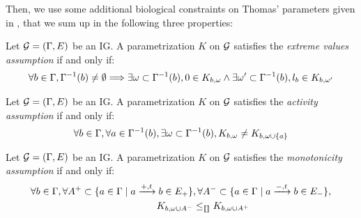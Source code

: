 Then, we use some additional biological constraints on Thomas' parameters given in
\cite{BernotSemBRN}, that we sum up in the following three properties:

\begin{property}
Let $\mathcal{G} = (\Gamma, E)$ be an IG. A parametrization $K$ on $\mathcal{G}$ satisfies the \emph{extreme values assumption} if and only if:
\label{pro:param_enum_extreme}
\begin{align*}
  \forall b \in \Gamma, \Gamma^{-1}(b) \neq \emptyset \Longrightarrow \exists \omega \subset \Gamma^{-1}(b), 0 \in K_{b,\omega} \wedge \exists \omega' \subset \Gamma^{-1}(b), l_b \in K_{b,\omega'}
\end{align*}
\end{property}

\begin{property}
\label{pro:param_enum_activity}
Let $\mathcal{G} = (\Gamma, E)$ be an IG. A parametrization $K$ on $\mathcal{G}$ satisfies the \emph{activity assumption} if and only if:
\begin{align*}
  \forall b \in \Gamma, \forall a \in \Gamma^{-1}(b), \exists \omega \subset \Gamma^{-1}(b), K_{b,\omega} \neq K_{b,\omega \cup \{ a \}}
\end{align*}
\end{property}

\begin{property}
\label{pro:param_enum_monotonicity}
Let $\mathcal{G} = (\Gamma, E)$ be an IG. A parametrization $K$ on $\mathcal{G}$ satisfies the \emph{monotonicity assumption} if and only if:
\begin{align*}
  \forall b \in \Gamma,
  \forall A^+ \subset \{ a \in \Gamma \mid a \xrightarrow{+, t} b \in E_+ \}&,
  \forall A^- \subset \{ a \in \Gamma \mid a \xrightarrow{-, t} b \in E_- \},\\
  K_{b,\omega \cup A^-} & \leq_{\llbracket\rrbracket} K_{b,\omega \cup A^+}
\end{align*}
\end{property}

